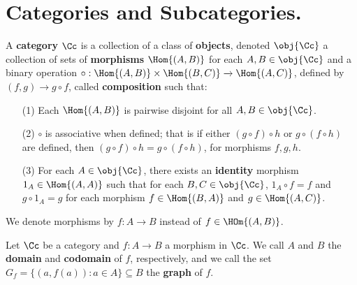 
\section{Categories and Subcategories.}

\begin{definition}
    A \textbf{category} $\Cc$ is a collection of a class of \textbf{objects},
    denoted $\obj{\Cc}$ a collection of sets of \textbf{morphisms} $\Hom{(A,B)}$
    for each $A,B \in \obj{\Cc}$ and a binary operation $\circ:\Hom{(A,B)}
    \times \Hom{(B,C)} \xrightarrow{} \Hom{(A,C)}$, defined by $(f,g) \xrightarrow{}
    g \circ f$, called \textbf{composition} such that:
    \begin{enumerate}
        \item[(1)] Each $\Hom{(A,B)}$ is pairwise disjoint for all $A,B \in
            \obj{\Cc}$.

        \item[(2)] $\circ$ is associative when defined; that is if either $(g
            \circ f) \circ h$ or $g \circ (f \circ h)$ are defined, then $(g
            \circ f) \circ h=g \circ (f \circ h)$, for morphisms $f,g,h$.

        \item[(3)] For each $A \in \obj{\Cc}$, there exists an \textbf{identity}
            morphism $1_A \in \Hom{(A,A)}$ such that for each $B,C \in
            \obj{\Cc}$, $1_A \circ f=f$ and  $g \circ 1_A=g$ for each morphism
            $f \in \Hom{(B,A)}$ and $g \in \Hom{(A,C)}$.
    \end{enumerate}
    We denote morphisms by $f:A \xrightarrow{} B$ instead of $f \in \HOm{(A,B)}$.
\end{definition}

\begin{definition}
    Let $\Cc$ be a category and  $f:A \xrightarrow{} B$ a morphism in $\Cc$. We
    call $A$ and  $B$ the  \textbf{domain} and \textbf{codomain} of $f$,
    respectively, and we call the set  $G_f=\{(a,f(a)) : a \in A\} \subseteq B$
    the \textbf{graph} of $f$.
\end{definition}

